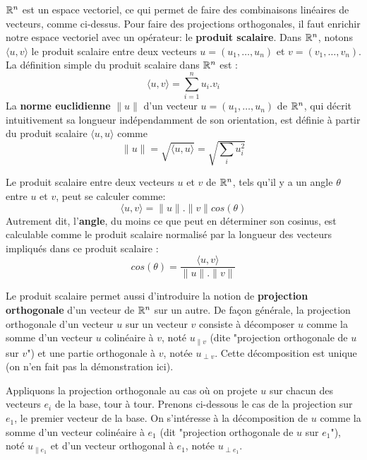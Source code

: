 $\mathbb{R}^n$ est un espace vectoriel, ce qui permet de faire des combinaisons linéaires de vecteurs, comme ci-dessus. Pour faire des projections orthogonales, il faut enrichir notre espace vectoriel avec un opérateur: le \textbf{produit scalaire}. Dans $\mathbb{R}^n$, notons $\langle u , v \rangle$ le produit scalaire entre deux vecteurs $u=(u_1,\dots,u_n)$ et $v=(v_1,\dots,v_n)$. La définition simple du produit scalaire dans $\mathbb{R}^n$ est : 
\begin{equation}
\langle u , v \rangle = \sum_{i=1}^n u_i.v_i
\end{equation}
La \textbf{norme euclidienne} $\|u\|$ d'un vecteur $u=(u_1,\dots,u_n)$ de $\mathbb{R}^n$, qui décrit intuitivement sa longueur indépendamment de son orientation, est définie à partir du produit scalaire $\langle u, u \rangle$ comme 
\begin{equation}
\|u\|= \sqrt{\langle u, u \rangle}=\sqrt{\sum_i u_i^2}
\end{equation}

Le produit scalaire entre deux vecteurs $u$ et $v$ de $\mathbb{R}^n$, tels qu'il y a un angle $\theta$ entre $u$ et $v$, peut se calculer comme:
\begin{equation}
\langle u, v \rangle=\|u\|.\|v\|cos(\theta)
\end{equation}
Autrement dit, l'\textbf{angle}, du moins ce que peut en déterminer son cosinus, est calculable comme le produit scalaire normalisé par la longueur des vecteurs impliqués dans ce produit scalaire :
\begin{equation}
cos(\theta) = \frac{\langle u, v \rangle}{\|u\|.\|v\|}
\end{equation}

Le produit scalaire permet aussi d'introduire la notion de \textbf{projection orthogonale} d'un vecteur de $\mathbb{R}^n$ sur un autre. De façon générale, la projection orthogonale d'un vecteur $u$ sur un vecteur $v$ consiste à décomposer $u$ comme la somme d'un vecteur $u$ colinéaire à $v$, noté $u_{\| v}$ (dite "projection orthogonale de $u$ sur $v$") et une partie orthogonale à $v$, notée $u_{\perp v}$. Cette décomposition est unique (on n'en fait pas la démonstration ici).


Appliquons la projection orthogonale au cas où on projete $u$ sur chacun des vecteurs $e_i$ de la base, tour à tour. Prenons ci-dessous le cas de la projection sur $e_1$, le premier vecteur de la base. On s'intéresse à la décomposition de $u$ comme la somme d'un vecteur colinéaire à $e_1$ (dit "projection orthogonale de $u$ sur $e_1$"), noté $u_{\| e_1}$ et d'un vecteur orthogonal à $e_1$, notée $u_{\perp e_1}$.

